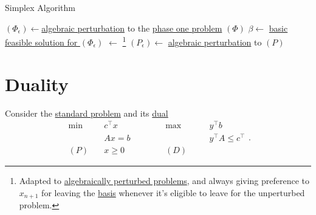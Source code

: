 \par
\begin{algorithm}[H]\label{algo:simplex-algorithm}
	\DontPrintSemicolon
	\caption{Simplex Algorithm}
	\BlankLine

	\((\Phi_{\epsilon})\gets\)\hyperref[def:perturbed-problem]{algebraic perturbation} to the \hyperref[def:phase-one-problem]{phase one problem} \((\Phi)\)\;
	\(\beta \gets \) \hyperref[prob:phase-one-problem]{basic feasible solution for \((\Phi_{\epsilon })\)}\;
	\result \(\gets\) \WFSimplex{\((\Phi _\epsilon )\), \(\beta\)}\footnote{Adapted to \hyperref[def:perturbed-problem]{algebraically perturbed problems}, and always giving preference to \(x_{n+1}\) for leaving the \hyperref[def:basic]{basis} whenever it's eligible to leave for the unperturbed problem.}\;
	\;
	\((P_{\epsilon} )\gets\) \hyperref[def:perturbed-problem]{algebraic perturbation} to \((P)\)\;
\end{algorithm}

\chapter{Duality}
Consider the \hyperref[def:standard-form]{standard problem} and its \hyperref[def:dual]{dual}
\[
	\begin{alignedat}{5}
		\min~&c^{\top}x\qquad\qquad &&\max ~ &&y^{\top}b\\
		&Ax = b && &&y^{\top}A\leq c^{\top}\\
		(P)\quad&x\geq  0 &&(D)\quad&&
	\end{alignedat}.
\]
